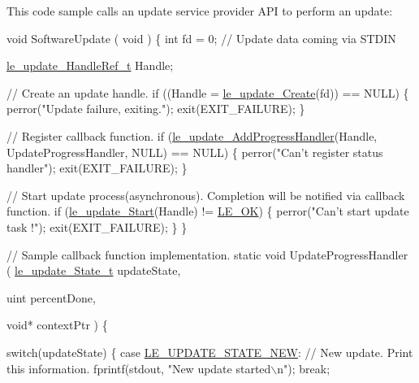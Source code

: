 This code sample calls an update service provider A\+P\+I to perform an update\+:


\begin{DoxyCode}
\textcolor{keywordtype}{void} SoftwareUpdate
(
    \textcolor{keywordtype}{void}
)
\{
    \textcolor{keywordtype}{int} fd = 0;  \textcolor{comment}{// Update data coming via STDIN}

    \hyperlink{le__update__interface_8h_a70c1de2e80807cdac13cec80456cc929}{le\_update\_HandleRef\_t} Handle;

    \textcolor{comment}{// Create an update handle.}
    \textcolor{keywordflow}{if} ((Handle = \hyperlink{le__update__interface_8h_a10d047c2901fcd00c6f4b4785ba76284}{le\_update\_Create}(fd)) == NULL)
    \{
         perror(\textcolor{stringliteral}{"Update failure, exiting."});
         exit(EXIT\_FAILURE);
    \}

    \textcolor{comment}{// Register callback function.}
    \textcolor{keywordflow}{if} (\hyperlink{le__update__interface_8h_acc7319e6d8e02dd1e4e06d800d76c235}{le\_update\_AddProgressHandler}(Handle, UpdateProgressHandler, NULL) == 
      NULL)
    \{
         perror(\textcolor{stringliteral}{"Can't register status handler"});
         exit(EXIT\_FAILURE);
    \}

    \textcolor{comment}{// Start update process(asynchronous). Completion will be notified via callback function.}
    \textcolor{keywordflow}{if} (\hyperlink{le__update__interface_8h_a7b300c8944da0fe9a919bc6bb14157dd}{le\_update\_Start}(Handle) != \hyperlink{le__basics_8h_a1cca095ed6ebab24b57a636382a6c86ca5066a4bcec691c6b67843b8f79656422}{LE\_OK})
    \{
         perror(\textcolor{stringliteral}{"Can't start update task !"});
         exit(EXIT\_FAILURE);
    \}
\}


\textcolor{comment}{// Sample callback function implementation.}
\textcolor{keyword}{static} \textcolor{keywordtype}{void} UpdateProgressHandler
(
    \hyperlink{le__update__interface_8h_ae9758536ebaf1842cdaaddd6cf95a672}{le\_update\_State\_t} updateState,   

    uint percentDone,                

    \textcolor{keywordtype}{void}* contextPtr                 
)
\{

    \textcolor{keywordflow}{switch}(updateState)
    \{
        \textcolor{keywordflow}{case} \hyperlink{le__update__interface_8h_ae9758536ebaf1842cdaaddd6cf95a672a789b71810ab23da9ec3b7d373c16ae08}{LE\_UPDATE\_STATE\_NEW}:
            \textcolor{comment}{// New update. Print this information.}
            fprintf(stdout, \textcolor{stringliteral}{"New update started\(\backslash\)n"});
            \textcolor{keywordflow}{break};


\end{DoxyCode}
